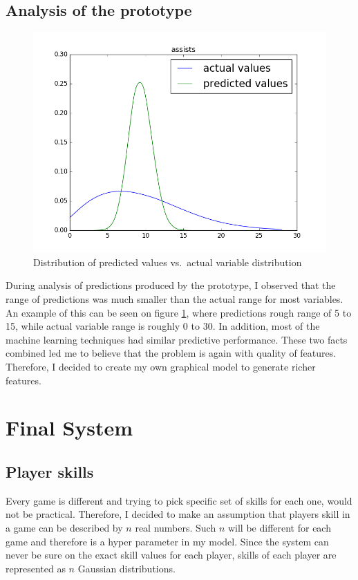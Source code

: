 \documentclass[12pt,a4paper]{book}
\begin{document}
\subsection{Analysis of the prototype}
\begin{figure}[h]
\centering
\includegraphics[scale=0.5]{predicted_assists}
\caption{Distribution of predicted values vs.\ actual variable distribution}
\label{fig:variablerange}
\end{figure}
During analysis of predictions produced by the prototype, I observed that the range of predictions was much smaller than the actual range for most variables.
An example of this can be seen on figure \ref{fig:variablerange}, where predictions rough range of 5 to 15, while actual variable range is roughly 0 to 30.
In addition, most of the machine learning techniques had similar predictive performance.
These two facts combined led me to believe that the problem is again with quality of features.
Therefore, I decided to create my own graphical model to generate richer features.
\section{Final System}
\subsection{Player skills}
Every game is different and trying to pick specific set of skills for each one, would not be practical.
Therefore, I decided to make an assumption that players skill in a game can be described by $n$ real numbers.
Such $n$ will be different for each game and therefore is a hyper parameter in my model.
Since the system can never be sure on the exact skill values for each player, skills of each player are represented as $n$ Gaussian distributions.
\end{document}

